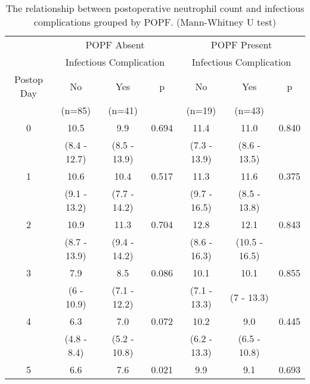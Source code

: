 \begin{table}[h]
	\centering
	\caption{The relationship between postoperative neutrophil count and infectious complications grouped by POPF. (Mann-Whitney U test)}
	\label{table:crp_comp_Neutrophil_vs_infections_popf_y1n0}
	\begin{tabular}{| c | c c c | c c c |}
		\hline
		           &       \multicolumn{3}{c|}{POPF Absent}       &      \multicolumn{3}{c|}{POPF Present}       \\
		           & \multicolumn{3}{c|}{Infectious Complication} & \multicolumn{3}{c|}{Infectious Complication} \\
		Postop Day & No           & Yes          & p             & No           & Yes           & p            \\
		           & (n=85)       & (n=41)       &               & (n=19)       & (n=43)        &  \\ \hline
		0          & 10.5         & 9.9          & 0.694         & 11.4         & 11.0          & 0.840 \\
		           & (8.4 - 12.7) & (8.5 - 13.9) &               & (7.3 - 13.9) & (8.6 - 13.5)  &  \\
		1          & 10.6         & 10.4         & 0.517         & 11.3         & 11.6          & 0.375 \\
		           & (9.1 - 13.2) & (7.7 - 14.2) &               & (9.7 - 16.5) & (8.5 - 13.8)  &  \\
		2          & 10.9         & 11.3         & 0.704         & 12.8         & 12.1          & 0.843 \\
		           & (8.7 - 13.9) & (9.4 - 14.2) &               & (8.6 - 16.3) & (10.5 - 16.5) &  \\
		3          & 7.9          & 8.5          & 0.086         & 10.1         & 10.1          & 0.855 \\
		           & (6 - 10.9)   & (7.1 - 12.2) &               & (7.1 - 13.3) & (7 - 13.3)    &  \\
		4          & 6.3          & 7.0          & 0.072         & 10.2         & 9.0           & 0.445 \\
		           & (4.8 - 8.4)  & (5.2 - 10.8) &               & (6.2 - 13.3) & (6.5 - 10.8)  &  \\
		5          & 6.6          & 7.6          & 0.021         & 9.9          & 9.1           & 0.693 \\

\end{tabular}
\end{table}
